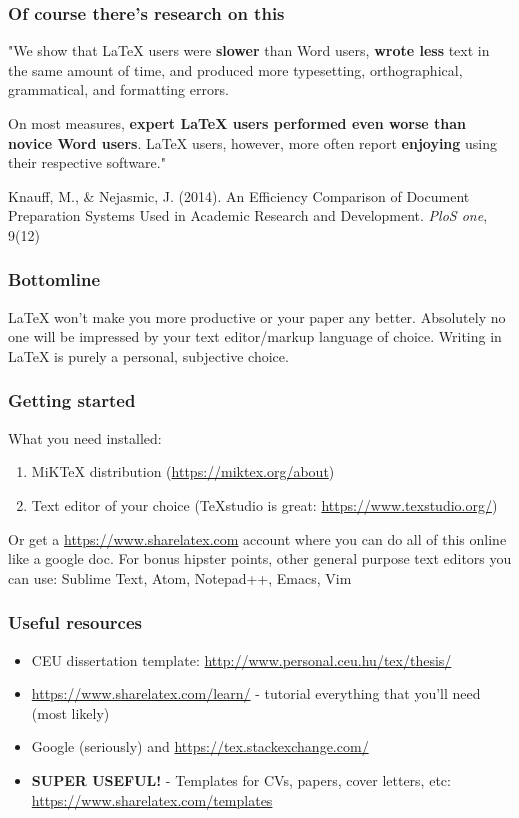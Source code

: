 \documentclass{beamer}
\begin{document}
\begin{frame}
	\frametitle{Of course there's research on this}
	"We show that LaTeX users were \textbf{slower} than Word users, \textbf{wrote less} text in the same amount of time, and produced more typesetting, orthographical, grammatical, and formatting errors.
	\medskip 
	
	On most measures, \textbf{expert LaTeX users performed even worse than novice Word users}. LaTeX users, however, more often report \textbf{enjoying} using their respective software." 
	\bigskip
	
	{\footnotesize Knauff, M., & Nejasmic, J. (2014). An Efficiency Comparison of Document Preparation Systems Used in Academic Research and Development. \textit{PloS one}, 9(12)\par}
\bigskip
\end{frame}

\begin{frame}
\frametitle{Bottomline}
LaTeX won't make you more productive or your paper any better. Absolutely no one will be impressed by your text editor/markup language of choice. Writing in LaTeX is purely a personal, subjective choice.\pause
\end{frame}


\begin{frame}
\frametitle{Getting started}
What you need installed:
\begin{enumerate}
\item MiKTeX distribution (\url{https://miktex.org/about})
\item Text editor of your choice (TeXstudio is great: \url{https://www.texstudio.org/}) \pause
\end{enumerate}
\bigskip
Or get a \url{https://www.sharelatex.com} account where you can do all of this online like a google doc.
\medskip
For bonus hipster points, other general purpose text editors you can use: Sublime Text, Atom, Notepad++, Emacs, Vim
\end{frame}


\begin{frame}
\frametitle{Useful resources}
\begin{itemize}
\item CEU dissertation template: \url{http://www.personal.ceu.hu/tex/thesis/}
\item \url{https://www.sharelatex.com/learn/} - tutorial everything that you'll need (most likely)
\item Google (seriously) and \url{https://tex.stackexchange.com/}
\item \textbf{SUPER USEFUL!} - Templates for CVs, papers, cover letters, etc: \url{https://www.sharelatex.com/templates}
\end{itemize}
\end{frame}
\end{document}
